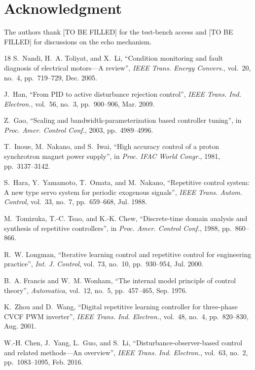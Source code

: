 \documentclass[journal]{IEEEtran}
\theoremstyle{remark}
\newcommand{\qq}[1]{\textquotedblleft#1\textquotedblright}
\begin{document}
\section*{Acknowledgment}
The authors thank [TO BE FILLED] for the test-bench access and [TO BE FILLED] for
discussions on the echo mechanism.


\begin{thebibliography}{18}
S.~Nandi, H.~A. Toliyat, and X.~Li, \qq{Condition monitoring and fault diagnosis of
electrical motors---A review}, \emph{IEEE Trans. Energy Convers.}, vol.~20, no.~4,
pp.~719--729, Dec. 2005.

J.~Han, \qq{From PID to active disturbance rejection control}, \emph{IEEE Trans. Ind.
Electron.}, vol.~56, no.~3, pp.~900--906, Mar. 2009.

Z.~Gao, \qq{Scaling and bandwidth-parameterization based controller tuning}, in
\emph{Proc. Amer. Control Conf.}, 2003, pp.~4989--4996.

T.~Inoue, M.~Nakano, and S.~Iwai, \qq{High accuracy control of a proton synchrotron
magnet power supply}, in \emph{Proc. IFAC World Congr.}, 1981, pp.~3137--3142.

S.~Hara, Y.~Yamamoto, T.~Omata, and M.~Nakano, \qq{Repetitive control system: A new
type servo system for periodic exogenous signals}, \emph{IEEE Trans. Autom. Control},
vol.~33, no.~7, pp.~659--668, Jul. 1988.

M.~Tomizuka, T.-C. Tsao, and K.-K. Chew, \qq{Discrete-time domain analysis and
synthesis of repetitive controllers}, in \emph{Proc. Amer. Control Conf.}, 1988,
pp.~860--866.

R.~W. Longman, \qq{Iterative learning control and repetitive control for engineering
practice}, \emph{Int. J. Control}, vol.~73, no.~10, pp.~930--954, Jul. 2000.

B.~A. Francis and W.~M. Wonham, \qq{The internal model principle of control theory},
\emph{Automatica}, vol.~12, no.~5, pp.~457--465, Sep. 1976.

K.~Zhou and D.~Wang, \qq{Digital repetitive learning controller for three-phase CVCF
PWM inverter}, \emph{IEEE Trans. Ind. Electron.}, vol.~48, no.~4, pp.~820--830,
Aug. 2001.

W.-H. Chen, J.~Yang, L.~Guo, and S.~Li, \qq{Disturbance-observer-based control and
related methods---An overview}, \emph{IEEE Trans. Ind. Electron.}, vol.~63, no.~2,
pp.~1083--1095, Feb. 2016.


\end{thebibliography}
\end{document}
